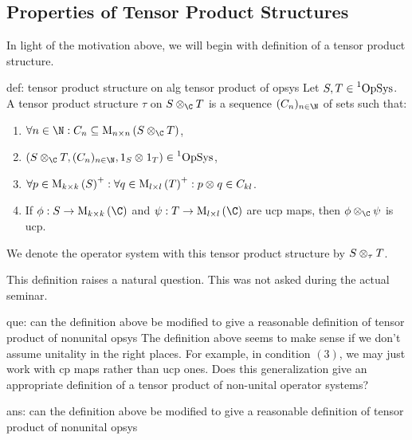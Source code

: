 \documentclass[main.tex]{subfiles}
\begin{document}
\subsection{Properties of Tensor Product Structures}
\label{subsec:tensor_products_of_operator_systems_I}


In light of the motivation above, we will begin with definition of a tensor product structure. 

\begin{definition}{}{def: tensor product structure on alg tensor product of opsys}
Let $S,T \in \operatorname{\prescript{1}{}{OpSys}}$. A tensor product structure $\tau$ on $\tensor{\C}{S}{T}$ is a sequence $(C_n)_{n \in \N}$ of sets such that:
\begin{enumerate}
    \item $\forall n \in \N: C_n \subseteq \Mat{n}{n}{\tensor{\C}{S}{T}}$,
    \item $(\tensor{\C}{S}{T},(C_n)_{n \in \N},\tensor{}{1_S}{1_T}) \in \UniOpSys$,
    \item $\forall p \in \text{M}_{k \times k}\left(S\right)^+: \forall q \in \text{M}_{l \times l}\left(T\right)^+: p \otimes_{} q \in C_{kl}$.
    \item If $\phi: S \to \Mat{k}{k}{\C}$ and $\psi: T \to \Mat{l}{l}{\C}$ are ucp maps, then $\tensor{\C}{\phi}{\psi}$ is ucp.
\end{enumerate}
We denote the operator system with this tensor product structure by $S \otimes_{\tau} T$. 
\end{definition}

This definition raises a natural question. This was not asked during the actual seminar.

\begin{Question}{}{que: can the definition above be modified to give a reasonable definition of tensor product of nonunital opsys}
The definition above seems to make sense if we don't assume unitality in the right places. For example, in condition $(3)$, we may just work with cp maps rather than ucp ones. Does this generalization give an appropriate definition of a tensor product of non-unital operator systems?
\end{Question}
\begin{Answer}{}{ans: can the definition above be modified to give a reasonable definition of tensor product of nonunital opsys}

\end{Answer}
\end{document}
